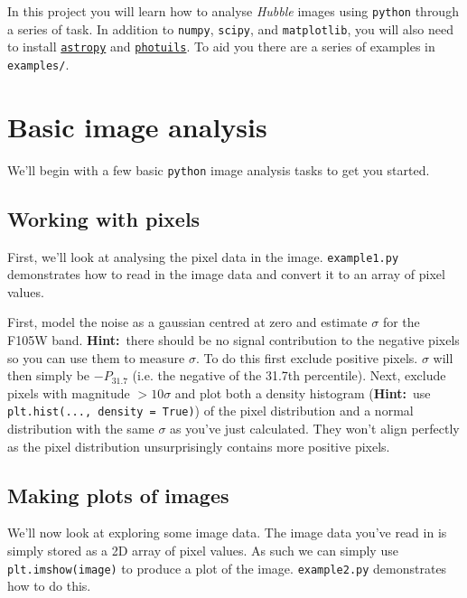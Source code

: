 \documentclass{article}
\newcommand{\hint}{\textbf{Hint:}}
\begin{document}
In this project you will learn how to analyse {\em Hubble} images using \texttt{python} through a series of task. In addition to \texttt{numpy}, \texttt{scipy}, and \texttt{matplotlib}, you will also need to install \href{https://www.astropy.org}{\texttt{astropy}} and \href{https://photutils.readthedocs.io/en/stable/}{\texttt{photuils}}. To aid you there are a series of examples in \texttt{examples/}.

\section{Basic image analysis} %

We'll begin with a few basic \texttt{python} image analysis tasks to get you started.

\subsection{Working with pixels}

First, we'll look at analysing the pixel data in the image. \texttt{example1.py} demonstrates how to read in the image data and convert it to an array of pixel values.

\begin{question}
First, model the noise as a gaussian centred at zero and estimate $\sigma$ for the F105W band. \hint\ there should be no signal contribution to the negative pixels so you can use them to measure $\sigma$. To do this first exclude positive pixels. $\sigma$ will then simply be $-P_{31.7}$ (i.e. the negative of the 31.7th percentile). Next, exclude pixels with magnitude $>10\sigma$ and plot both a density histogram (\hint\ use \texttt{plt.hist(..., density = True)}) of the pixel distribution and a normal distribution with the same $\sigma$ as you've just calculated. They won't align perfectly as the pixel distribution unsurprisingly contains more positive pixels.
\end{question}


\subsection{Making plots of images}

We'll now look at exploring some image data. The image data you've read in is simply stored as a 2D array of pixel values. As such we can simply use \texttt{plt.imshow(image)} to produce a plot of the image. \texttt{example2.py} demonstrates how to do this.
\end{document}
